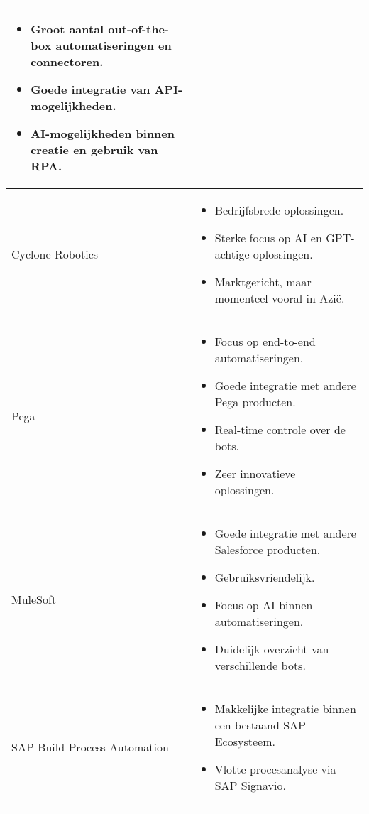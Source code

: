 \begin{longtable}{|p{3cm}|p{12cm}|}
\begin{itemize}[left=0pt]
                        \item Groot aantal out-of-the-box automatiseringen en connectoren.
                        \item Goede integratie van API-mogelijkheden.
                        \item AI-mogelijkheden binnen creatie en gebruik van RPA.
                    \end{itemize} \\
    \hline
    Cyclone Robotics & \begin{itemize}[left=0pt]
                            \item Bedrijfsbrede oplossingen.
                            \item Sterke focus op AI en GPT-achtige oplossingen.
                            \item Marktgericht, maar momenteel vooral in Azië.
                        \end{itemize} \\
    \hline
    Pega & \begin{itemize}[left=0pt]
                \item Focus op end-to-end automatiseringen.
                \item Goede integratie met andere Pega producten.
                \item Real-time controle over de bots.
                \item Zeer innovatieve oplossingen.
            \end{itemize} \\
    \hline
    MuleSoft & \begin{itemize}[left=0pt]
                    \item Goede integratie met andere Salesforce producten.
                    \item Gebruiksvriendelijk.
                    \item Focus op AI binnen automatiseringen.
                    \item Duidelijk overzicht van verschillende bots.
                \end{itemize} \\
    \hline
    SAP Build Process Automation & \begin{itemize}[left=0pt]
                                        \item Makkelijke integratie binnen een bestaand SAP Ecosysteem.
                                        \item Vlotte procesanalyse via SAP Signavio.

\end{itemize}
\end{longtable}
